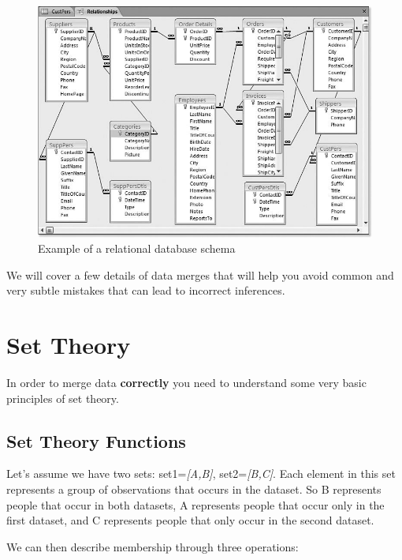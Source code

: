 \documentclass[]{book}
\theoremstyle{definition}
\theoremstyle{definition}
\theoremstyle{definition}
\theoremstyle{remark}
\begin{document}
\begin{figure}

{\centering \includegraphics[width=0.8\linewidth]{figures/SampleRetailDatabase} 

}

\caption{Example of a relational database schema}\label{fig:unnamed-chunk-120}
\end{figure}

We will cover a few details of data merges that will help you avoid
common and very subtle mistakes that can lead to incorrect inferences.

\hypertarget{set-theory}{%
\section{Set Theory}\label{set-theory}}

In order to merge data \textbf{correctly} you need to understand some
very basic principles of set theory.

\hypertarget{set-theory-functions}{%
\subsection{Set Theory Functions}\label{set-theory-functions}}

Let's assume we have two sets: set1=\emph{{[}A,B{]}},
set2=\emph{{[}B,C{]}}. Each element in this set represents a group of
observations that occurs in the dataset. So B represents people that
occur in both datasets, A represents people that occur only in the first
dataset, and C represents people that only occur in the second dataset.

We can then describe membership through three operations:
\end{document}
